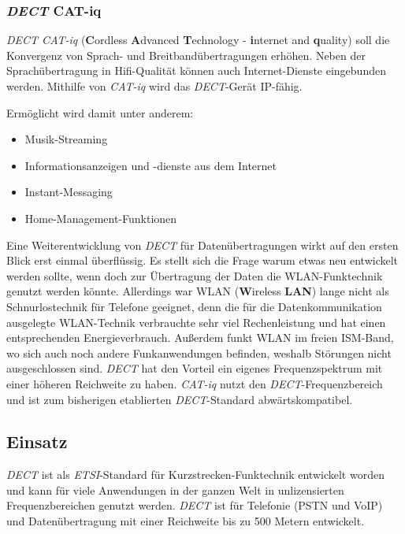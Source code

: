 \begin{multicols}{3}

\subsubsection*{\textit{DECT} CAT-iq}
\textit{DECT CAT-iq} (\textbf{C}ordless \textbf{A}dvanced \textbf{T}echnology - \textbf{i}nternet and \textbf{q}uality) soll die Konvergenz von Sprach- und Breitbandübertragungen erhöhen. Neben der Sprachübertragung in Hifi-Qualität können auch Internet-Dienste eingebunden werden. Mithilfe von \textit{CAT-iq} wird das \textit{DECT}-Gerät IP-fähig.

Ermöglicht wird damit unter anderem:
\begin{itemize}
\item Musik-Streaming
\item Informationsanzeigen und -dienste aus dem Internet
\item Instant-Messaging 
\item Home-Management-Funktionen
\end{itemize}

Eine Weiterentwicklung von \textit{DECT} für Datenübertragungen wirkt auf den ersten Blick erst einmal überflüssig. Es stellt sich die Frage warum etwas neu entwickelt werden sollte, wenn doch zur Übertragung der Daten die WLAN-Funktechnik genutzt werden könnte. Allerdings war WLAN (\textbf{W}ireless \textbf{LAN}) lange nicht als Schnurlostechnik für Telefone geeignet, denn die für die Datenkommunikation ausgelegte WLAN-Technik verbrauchte sehr viel Rechenleistung und hat einen entsprechenden Energieverbrauch. Außerdem funkt WLAN im freien ISM-Band, wo sich auch noch andere Funkanwendungen befinden, weshalb Störungen nicht ausgeschlossen sind. \textit{DECT} hat den Vorteil ein eigenes Frequenzspektrum mit einer höheren Reichweite zu haben. \textit{CAT-iq} nutzt den \textit{DECT}-Frequenzbereich und ist zum bisherigen etablierten \textit{DECT}-Standard abwärtskompatibel. \cite{dect.3}

\subsection*{Einsatz}
\textit{DECT} ist als \textit{ETSI}-Standard für Kurzstrecken-Funktechnik entwickelt worden und kann für viele Anwendungen in der ganzen Welt in unlizensierten Frequenzbereichen genutzt werden. \textit{DECT} ist für Telefonie (PSTN und VoIP) und Datenübertragung mit einer Reichweite bis zu 500 Metern entwickelt.


\end{multicols}
